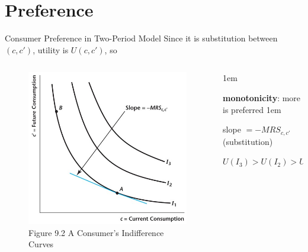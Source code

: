 \documentclass[11pt,aspectratio=43]{beamer}
\let\olditemize=\itemize
\let\endolditemize=\enditemize
\renewenvironment{itemize}{\olditemize \itemsep1em}{\endolditemize}
\let\oldenumerate=\enumerate
\let\endoldenumerate=\endenumerate
\renewenvironment{enumerate}{\oldenumerate \itemsep1em}{ \endoldenumerate}
\theoremstyle{definition}
\begin{document}
\section{Preference}
\label{sec:Preference}

\begin{frame}{Consumer Preference in Two-Period Model}
\label{slide:Consumer_Preference_in_Two_Period_Model}
Since it is substitution between $ ( c, c' ) $, utility is $ U( c, c' ) $, so
\begin{columns}
    \begin{column}{0.4\textwidth}
        \begin{figure}
            \caption{\scriptsize Figure 9.2  A Consumer’s Indifference Curves}
            \includegraphics[width=\textwidth]{./figures/Figure9_2.jpg}
        \end{figure}
    \end{column}
    \begin{column}{0.6\textwidth}
        \begin{enumerate}
            \item \textbf{monotonicity}: more is preferred
            \begin{itemize}
                \item slope $ = -MRS_{c, c'}$ (substitution)
                \item $ U( I_{3} ) > U( I_{2} ) > U( I_{1} ) $

\end{itemize}
\end{enumerate}
\end{column}
\end{columns}
\end{frame}
\end{document}
